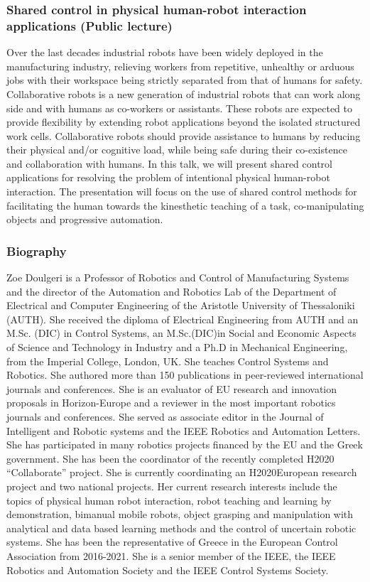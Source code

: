 \documentclass[12pt,a4paper]{article}
\begin{document}
\subsubsection{Shared control in physical human-robot interaction applications (Public lecture)}

Over the last decades industrial robots have been widely deployed in the manufacturing industry, relieving workers from repetitive, unhealthy or arduous jobs with their workspace being strictly separated from that of humans for safety. Collaborative robots is a new generation of industrial robots that can work along side and with humans as co-workers or assistants. These robots are expected to provide flexibility by extending robot applications beyond the isolated structured work cells.  Collaborative robots should provide assistance to humans by reducing their physical and/or cognitive load, while being safe during their co-existence and collaboration with humans. In this talk, we will present shared control applications for resolving the problem of intentional physical human-robot interaction. The presentation will focus on the use of shared control methods for facilitating the human towards the kinesthetic teaching of a task, co-manipulating objects and progressive automation.

\subsubsection{Biography}

Zoe Doulgeri is a Professor of Robotics and Control of Manufacturing Systems and the director of the Automation and Robotics Lab of the Department of Electrical and Computer Engineering of the Aristotle University of Thessaloniki (AUTH). She received the diploma of Electrical Engineering from AUTH and an M.Sc. (DIC) in Control Systems, an M.Sc.(DIC)in Social and Economic Aspects of Science and Technology in Industry and a Ph.D in Mechanical Engineering, from the Imperial College, London, UK. She teaches Control Systems and Robotics. She authored more than 150 publications in peer-reviewed international journals and conferences. She is an evaluator of EU research and innovation proposals in Horizon-Europe and a reviewer in the most important robotics journals and conferences. She served as associate editor in the Journal of Intelligent and Robotic systems and the IEEΕ Robotics and Automation Letters. She has participated in many robotics projects financed by the EU and the Greek government. She has been the coordinator of the recently completed H2020 “Collaborate” project. She is currently coordinating an H2020European research project and two national projects. Her current research interests include the topics of physical human robot interaction, robot teaching and learning by demonstration, bimanual mobile robots, object grasping and manipulation with analytical and data based learning methods and the control of uncertain robotic systems. She has been the representative of Greece in the European Control Association from 2016-2021. She is a senior member of the IEEE, the IEEE Robotics and Automation Society and the IEEE Control Systems Society.
\end{document}
